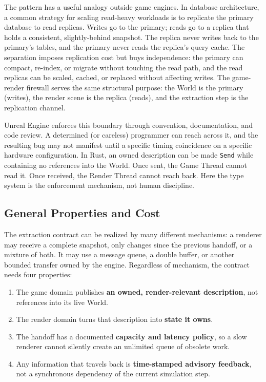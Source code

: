 \documentclass[
  11pt,
  letterpaper,
  DIV=11,
  numbers=noendperiod,
  twoside,
  open=right]{scrreprt}
\begin{document}
The pattern has a useful analogy outside game engines. In database
architecture, a common strategy for scaling read-heavy workloads is to
replicate the primary database to read replicas. Writes go to the
primary; reads go to a replica that holds a consistent, slightly-behind
snapshot. The replica never writes back to the primary's tables, and the
primary never reads the replica's query cache. The separation imposes
replication cost but buys independence: the primary can compact,
re-index, or migrate without touching the read path, and the read
replicas can be scaled, cached, or replaced without affecting writes.
The game-render firewall serves the same structural purpose: the World
is the primary (writes), the render scene is the replica (reads), and
the extraction step is the replication channel.

Unreal Engine enforces this boundary through convention, documentation,
and code review. A determined (or careless) programmer can reach across
it, and the resulting bug may not manifest until a specific timing
coincidence on a specific hardware configuration. In Rust, an owned
description can be made \texttt{Send} while containing no references
into the World. Once sent, the Game Thread cannot read it. Once
received, the Render Thread cannot reach back. Here the type system is
the enforcement mechanism, not human discipline.

\subsection{General Properties and
Cost}\label{general-properties-and-cost}

The extraction contract can be realized by many different mechanisms: a
renderer may receive a complete snapshot, only changes since the
previous handoff, or a mixture of both. It may use a message queue, a
double buffer, or another bounded transfer owned by the engine.
Regardless of mechanism, the contract needs four properties:

\begin{enumerate}
\def\labelenumi{\arabic{enumi}.}
\item
  The game domain publishes \textbf{an owned, render-relevant
  description}, not references into its live World.
\item
  The render domain turns that description into \textbf{state it owns}.
\item
  The handoff has a documented \textbf{capacity and latency policy}, so
  a slow renderer cannot silently create an unlimited queue of obsolete
  work.
\item
  Any information that travels back is \textbf{time-stamped advisory
  feedback}, not a synchronous dependency of the current simulation
  step.
\end{enumerate}
\end{document}
